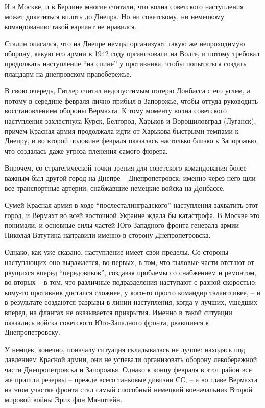 И в Москве, и в Берлине многие считали, что волна советского наступления может
докатиться вплоть до Днепра. Но ни советскому, ни немецкому командованию такой
вариант не нравился.

Сталин опасался, что на Днепре немцы организуют такую же непроходимую оборону,
какую его армии в 1942 году организовали на Волге, и потому требовал продолжать
наступление \enquote{на спине} у противника, чтобы попытаться создать плацдарм на
днепровском правобережье.

В свою очередь, Гитлер считал недопустимым потерю Донбасса с его углем, а
потому в середине февраля лично прибыл в Запорожье, чтобы оттуда руководить
восстановлением обороны Вермахта. К тому моменту волна советского наступления
захлестнула Курск, Белгород, Харьков и Ворошиловград (Луганск), причем Красная
армия продолжала идти от Харькова быстрыми темпами к Днепру, и во второй
половине февраля оказалась настолько близко к Запорожью, что создалась даже
угроза пленения самого фюрера.

Впрочем, со стратегической точки зрения для советского командования более
важным был другой город на Днепре – Днепропетровск: именно через него шли все
транспортные артерии, снабжавшие немецкие войска на Донбассе.

Сумей Красная армия в ходе \enquote{послесталинградского} наступления захватить этот
город, и Вермахт во всей восточной Украине ждала бы катастрофа. В Москве это
понимали, и основные силы частей Юго-Западного фронта генерала армии Николая
Ватутина направили именно в сторону Днепропетровска.

Однако, как уже сказано, наступление имеет свои пределы. Со стороны наступающих
оно выражается, во-первых, в том, что тыловые части отстают от рвущихся вперед
\enquote{передовиков}, создавая проблемы со снабжением и ремонтом, во-вторых – в том,
что различные подразделения наступают с разной скоростью: кому-то противник
достался сложнее, у кого-то просто командир талантливее, – и в результате
создаются разрывы в линии наступления, когда у лучших, ушедших вперед, на
флангах не оказывается прикрытия. Именно в такой ситуации оказались войска
советского Юго-Западного фронта, рвавшиеся к Днепропетровску.

У немцев, конечно, поначалу ситуация складывалась не лучше: находясь под
давлением Красной армии, они не успевали организовать оборону левобережной
части Днепропетровска и Запорожья. Однако к концу февраля в этот район все же
пришли резервы – прежде всего танковые дивизии СС, – а во главе Вермахта на
этом участке фронта стал самый способный немецкий военачальник Второй мировой
войны Эрих фон Манштейн.

